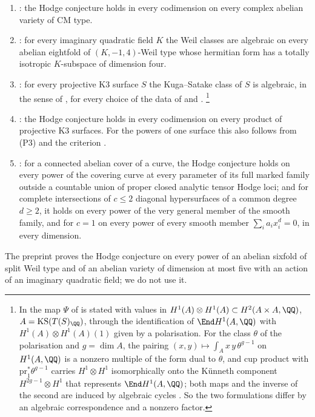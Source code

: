 \begin{enumerate}[label=\textup{(P\arabic*)},leftmargin=2.8em,itemsep=2pt]
\item \cite[Theorem~1.1]{OAI26e}: the Hodge conjecture holds in every
  codimension on every complex abelian variety of CM type.
\item \cite[Theorem~1.1]{OAI26d}: for every imaginary quadratic field $K$ the
  Weil classes are algebraic on every abelian eightfold of
  $(K,-1,4)$-Weil type whose hermitian form has a totally isotropic
  $K$-subspace of dimension four.
\item \cite[Theorem~1.1]{OAI26c}: for every projective K3 surface $S$ the
  Kuga--Satake class of $S$ is algebraic, in the sense of
  , for every choice of the data of
   and .%
\footnote{In \cite{OAI26c} the map $\Psi$ of  is stated
with values in $H^{1}(A)\otimes H^{1}(A)\subset H^{2}(A\times A,\QQ)$,
$A=\mathrm{KS}(T(S)_{\QQ})$, through the identification of
$\End H^{1}(A,\QQ)$ with $H^{1}(A)\otimes H^{1}(A)(1)$ given by a
polarisation. For the class $\theta$ of the polarisation and $g=\dim A$, the
pairing $(x,y)\mapsto\int_{A}x\,y\,\theta^{g-1}$ on $H^{1}(A,\QQ)$ is a
nonzero multiple of the form dual to $\theta$, and cup product with
$\mathrm{pr}_{1}^{*}\theta^{g-1}$ carries $H^{1}\otimes H^{1}$ isomorphically
onto the K\"unneth component $H^{2g-1}\otimes H^{1}$ that represents
$\End H^{1}(A,\QQ)$; both maps and the inverse of the second are induced by
algebraic cycles \cite[\S2]{Kle68}. So the two formulations differ by an
algebraic correspondence and a nonzero factor.}
\item \cite[Theorem~1.1]{OAI26f}: the Hodge conjecture holds in every
  codimension on every product of projective K3 surfaces. For the powers of
  one surface this also follows from (P3) and the criterion
  \cite[Theorem~1.1]{OAI26b}.
\item \cite[Theorems~1.1 and~1.2]{OAI26a}: for a connected abelian cover of a
  curve, the Hodge conjecture holds on every power of the covering curve at
  every parameter of its full marked family outside a countable union of
  proper closed analytic tensor Hodge loci; and for complete intersections
  of $c\le2$ diagonal hypersurfaces of a common degree $d\ge2$, it holds on
  every power of the very general member of the smooth family, and for $c=1$
  on every power of every smooth member $\sum_{i}a_{i}x_{i}^{d}=0$, in every
  dimension.
\end{enumerate}
The preprint \cite{OAI26g} proves the Hodge conjecture on every power of an
abelian sixfold of split Weil type and of an abelian variety of dimension at
most five with an action of an imaginary quadratic field; we do not use it.

